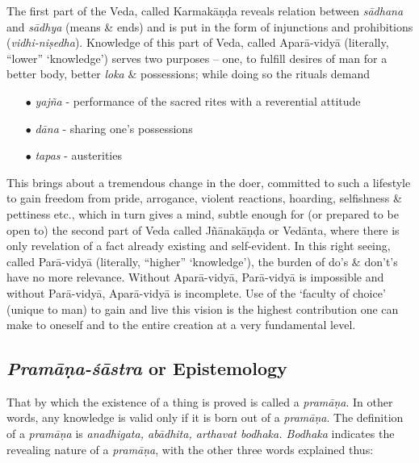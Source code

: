 The first part of the Veda, called Karmakāṇḍa reveals relation between  {\sl sādhana} and {\sl sādhya} (means \& ends) and is put in the form of injunctions and prohibitions ({\sl vidhi-niṣedha}). Knowledge of this part of Veda, called Aparā-vidyā (literally, ``lower'' `knowledge') serves two purposes -- one, to fulﬁll desires of man for a better body, better {\sl loka} \& possessions; while doing so the rituals demand 
\begin{itemize}
\item[$\bullet$] {\sl yajña} - performance of the sacred rites with a reverential attitude 

\item[$\bullet$] {\sl dāna} - sharing one's possessions 

\item[$\bullet$] {\sl tapas} - austerities 
\end{itemize}

This brings about a tremendous change in the doer, committed to such a lifestyle to gain freedom from pride, arrogance, violent reactions, hoarding, selﬁshness \& pettiness etc., which in turn gives a mind, subtle enough for (or prepared to be open to) the second part of Veda called Jñānakāṇḍa or Vedānta, where there is only revelation of a fact already existing and self-evident. In this right seeing, called Parā-vidyā (literally, ``higher'' `knowledge'), the burden of do’s \& don't's have no more relevance. Without Aparā-vidyā, Parā-vidyā is impossible and without Parā-vidyā, Aparā-vidyā is incomplete. Use of the `faculty of choice' (unique to man) to gain and live this vision is the highest contribution one can make to oneself and to the entire creation at a very fundamental level.

\subsection{{{\sl\bfseries Pramāṇa-śāstra}\relax} or Epistemology}\label{art12-sec2.2}

That by which the existence of a thing is proved is called a {\sl pramāṇa}. In other words, any knowledge is valid only if it is born out of a {\sl pramāṇa}. The deﬁnition of a {\sl pramāṇa} is {\sl anadhigata, abādhita, arthavat bodhaka. Bodhaka} indicates the revealing nature of a {\sl pramāṇa}, with the other three words explained thus:

